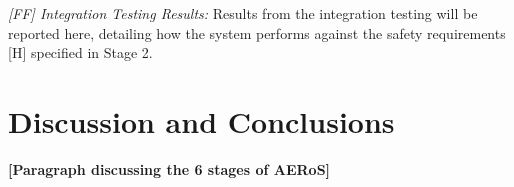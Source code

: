 \documentclass[runningheads]{llncs}
\begin{document}
\emph{[FF] Integration Testing Results:} Results from the integration testing will be reported here, detailing how the system performs against the safety requirements [H] specified in Stage 2.


\section{Discussion and Conclusions} \label{discussion-conclusions}
\noindent \textbf{[Paragraph discussing the 6 stages of AERoS]}
\end{document}
